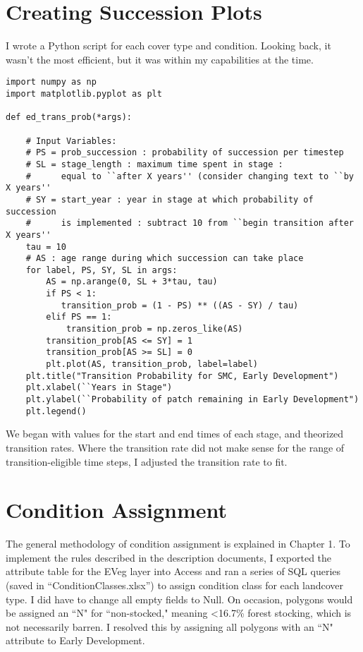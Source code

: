 \section{Creating Succession Plots}
I wrote a Python script for each cover type and condition. Looking back, it wasn't the most efficient, but it was within my capabilities at the time.
\lstset{language=Python}
\begin{lstlisting}
import numpy as np
import matplotlib.pyplot as plt

def ed_trans_prob(*args):

    # Input Variables:
    # PS = prob_succession : probability of succession per timestep
    # SL = stage_length : maximum time spent in stage :
    #      equal to ``after X years'' (consider changing text to ``by X years''
    # SY = start_year : year in stage at which probability of succession
    #      is implemented : subtract 10 from ``begin transition after X years''
    tau = 10
    # AS : age range during which succession can take place
    for label, PS, SY, SL in args:
        AS = np.arange(0, SL + 3*tau, tau)
        if PS < 1:
           transition_prob = (1 - PS) ** ((AS - SY) / tau)
        elif PS == 1:
            transition_prob = np.zeros_like(AS)
        transition_prob[AS <= SY] = 1
        transition_prob[AS >= SL] = 0
        plt.plot(AS, transition_prob, label=label)
    plt.title("Transition Probability for SMC, Early Development")
    plt.xlabel(``Years in Stage")
    plt.ylabel(``Probability of patch remaining in Early Development")
    plt.legend()
\end{lstlisting}

We began with values for the start and end times of each stage, and theorized transition rates. Where the transition rate did not make sense for the range of transition-eligible time steps, I adjusted the transition rate to fit.

\section{Condition Assignment}
The general methodology of condition assignment is explained in Chapter 1. To implement the rules described in the description documents, I exported the attribute table for the EVeg layer into Access and ran a series of SQL queries (saved in ``ConditionClasses.xlsx'') to assign condition class for each landcover type. I did have to change all empty fields to Null. On occasion, polygons would be assigned an ``N" for 	``non-stocked," meaning \textless 16.7\% forest stocking, which is not necessarily barren. I resolved this by assigning all polygons with an ``N" attribute to Early Development. 


